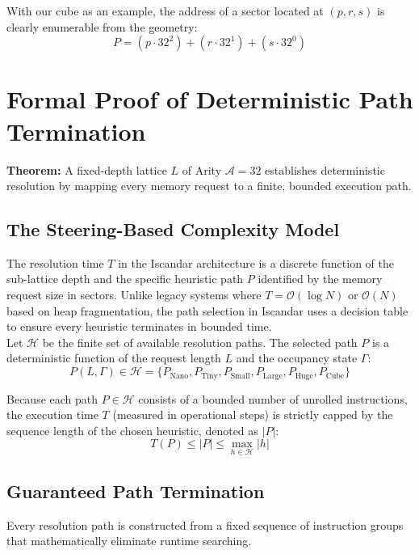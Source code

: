 \documentclass[11pt]{article}
\begin{document}
With our cube as an example, the address of a sector located at $(p, r, s)$ is clearly enumerable from the geometry:
\begin{equation}
    P = (p \cdot 32^2) + (r \cdot 32^1) + (s \cdot 32^0)
\end{equation}



\section{Formal Proof of Deterministic Path Termination}

\textbf{Theorem:} A fixed-depth lattice $L$ of Arity $\mathcal{A} = 32$ establishes deterministic resolution by mapping every memory request to a finite, bounded execution path.

\subsection{The Steering-Based Complexity Model}
The resolution time $T$ in the Iscandar architecture is a discrete function of the sub-lattice depth and the specific heuristic path $P$ identified by the memory request size in sectors. Unlike legacy systems where $T = \mathcal{O}(\log N)$ or $\mathcal{O}(N)$ based on heap fragmentation, the path selection in Iscandar uses a decision table to ensure every heuristic terminates in bounded time.\\ 

Let $\mathcal{H}$ be the finite set of available resolution paths. The selected path $P$ is a deterministic function of the request length $L$ and the occupancy state $\Gamma$:
\begin{equation}
    P(L, \Gamma) \in \mathcal{H} = \{P_{\text{Nano}}, P_{\text{Tiny}}, P_{\text{Small}}, P_{\text{Large}}, P_{\text{Huge}}, P_{\text{Cube}}\}
\end{equation}

Because each path $P \in \mathcal{H}$ consists of a bounded number of unrolled instructions, the execution time $T$ (measured in operational steps) is strictly capped by the sequence length of the chosen heuristic, denoted as $|P|$:
\begin{equation}
    T(P) \le |P| \le \max_{h \in \mathcal{H}} |h|
\end{equation}

\subsection{Guaranteed Path Termination}
Every resolution path is constructed from a fixed sequence of instruction groups that mathematically eliminate runtime searching.
\end{document}
